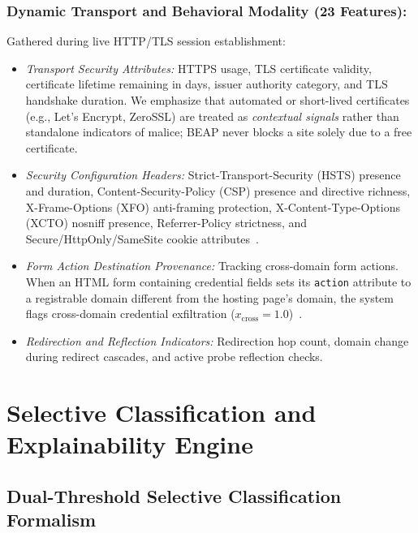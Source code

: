\documentclass[conference]{IEEEtran}
\begin{document}
\subsubsection{Dynamic Transport and Behavioral Modality (23 Features):} Gathered during live HTTP/TLS session establishment:
\begin{itemize}[leftmargin=2.5em]
    \item \textit{Transport Security Attributes:} HTTPS usage, TLS certificate validity, certificate lifetime remaining in days, issuer authority category, and TLS handshake duration. We emphasize that automated or short-lived certificates (e.g., Let's Encrypt, ZeroSSL) are treated as \textit{contextual signals} rather than standalone indicators of malice; BEAP never blocks a site solely due to a free certificate.
    \item \textit{Security Configuration Headers:} Strict-Transport-Security (HSTS) presence and duration, Content-Security-Policy (CSP) presence and directive richness, X-Frame-Options (XFO) anti-framing protection, X-Content-Type-Options (XCTO) nosniff presence, Referrer-Policy strictness, and Secure/HttpOnly/SameSite cookie attributes~\cite{kalabarige2023}.
    \item \textit{Form Action Destination Provenance:} Tracking cross-domain form actions. When an HTML form containing credential fields sets its \texttt{action} attribute to a registrable domain different from the hosting page's domain, the system flags cross-domain credential exfiltration ($x_{\text{cross}} = 1.0$)~\cite{sanchez2022,castano2023}.
    \item \textit{Redirection and Reflection Indicators:} Redirection hop count, domain change during redirect cascades, and active probe reflection checks.
\end{itemize}

\section{Selective Classification and Explainability Engine}\label{selective-classification-method}

\subsection{Dual-Threshold Selective Classification Formalism}\label{dual-threshold}
\end{document}
